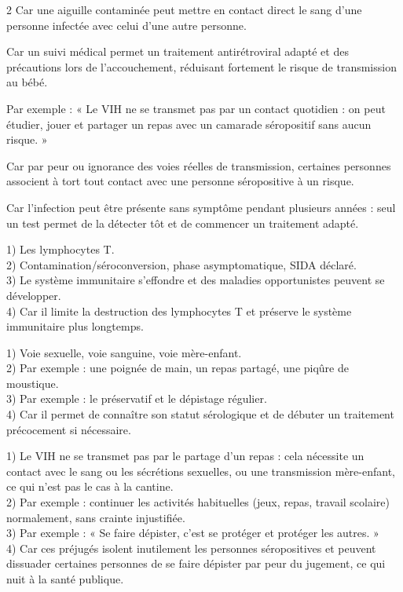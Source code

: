 \begin{multicols}{2}
Car une aiguille contaminée peut mettre en contact direct le sang d'une personne
infectée avec celui d'une autre personne.

Car un suivi médical permet un traitement antirétroviral adapté et des précautions lors
de l'accouchement, réduisant fortement le risque de transmission au bébé.

Par exemple : « Le VIH ne se transmet pas par un contact quotidien : on peut étudier,
jouer et partager un repas avec un camarade séropositif sans aucun risque. »

Car par peur ou ignorance des voies réelles de transmission, certaines personnes
associent à tort tout contact avec une personne séropositive à un risque.

Car l'infection peut être présente sans symptôme pendant plusieurs années : seul un test
permet de la détecter tôt et de commencer un traitement adapté.

1) Les lymphocytes T.\\
2) Contamination/séroconversion, phase asymptomatique, SIDA déclaré.\\
3) Le système immunitaire s'effondre et des maladies opportunistes peuvent se
développer.\\
4) Car il limite la destruction des lymphocytes T et préserve le système immunitaire
plus longtemps.

1) Voie sexuelle, voie sanguine, voie mère-enfant.\\
2) Par exemple : une poignée de main, un repas partagé, une piqûre de moustique.\\
3) Par exemple : le préservatif et le dépistage régulier.\\
4) Car il permet de connaître son statut sérologique et de débuter un traitement
précocement si nécessaire.

1) Le VIH ne se transmet pas par le partage d'un repas : cela nécessite un contact avec
le sang ou les sécrétions sexuelles, ou une transmission mère-enfant, ce qui n'est pas le
cas à la cantine.\\
2) Par exemple : continuer les activités habituelles (jeux, repas, travail scolaire)
normalement, sans crainte injustifiée.\\
3) Par exemple : « Se faire dépister, c'est se protéger et protéger les autres. »\\
4) Car ces préjugés isolent inutilement les personnes séropositives et peuvent dissuader
certaines personnes de se faire dépister par peur du jugement, ce qui nuit à la santé
publique.

\end{multicols}
\exercicesBanner
